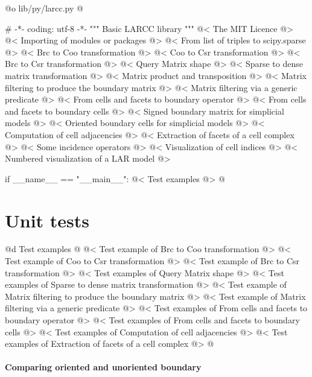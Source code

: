 \documentclass[11pt,oneside]{article}	%
\begin{document}
@o lib/py/larcc.py
@{# -*- coding: utf-8 -*-
""" Basic LARCC library """
@< The MIT Licence @>
@< Importing of modules or packages @>
@< From list of triples to scipy.sparse @>
@< Brc to Coo transformation @>
@< Coo to Csr transformation @>
@< Brc to Csr transformation @>
@< Query Matrix shape @>
@< Sparse to dense matrix transformation @>
@< Matrix product and transposition @>
@< Matrix filtering to produce the boundary matrix @>
@< Matrix filtering via a generic predicate @>
@< From cells and facets to boundary operator @>
@< From cells and facets to boundary cells @>
@< Signed boundary matrix for simplicial models @>
@< Oriented boundary cells for simplicial models @>
@< Computation of cell adjacencies @>
@< Extraction of facets of a cell complex @>
@< Some incidence operators @>
@< Visualization of cell indices @>
@< Numbered visualization of a LAR model @>

if __name__ == "__main__": 
	@< Test examples @>
@}

\section{Unit tests}


@d Test examples
@{
@< Test example of Brc to Coo transformation @>
@< Test example of Coo to Csr transformation @>
@< Test example of Brc to Csr transformation @>
@< Test examples of Query Matrix shape @>
@< Test examples of Sparse to dense matrix transformation @>
@< Test example of Matrix filtering to produce the boundary matrix @>
@< Test example of Matrix filtering via a generic predicate @>
@< Test examples of From cells and facets to boundary operator @>
@< Test examples of From cells and facets to boundary cells @>
@< Test examples of Computation of cell adjacencies @>
@< Test examples of Extraction of facets of a cell complex @>
@}

\paragraph{Comparing oriented and unoriented boundary}
\end{document}

